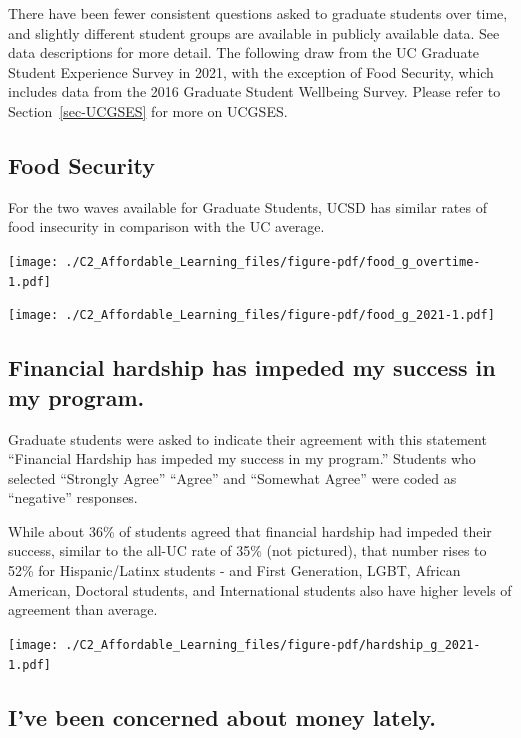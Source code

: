 \documentclass[
  letterpaper,
  DIV=11,
  numbers=noendperiod]{scrreprt}
\begin{document}
There have been fewer consistent questions asked to graduate students
over time, and slightly different student groups are available in
publicly available data. See data descriptions for more detail. The
following draw from the UC Graduate Student Experience Survey in 2021,
with the exception of Food Security, which includes data from the 2016
Graduate Student Wellbeing Survey. Please refer to
Section~\ref{sec-UCGSES} for more on UCGSES.

\hypertarget{food-security-1}{%
\subsection{Food Security}\label{food-security-1}}

For the two waves available for Graduate Students, UCSD has similar
rates of food insecurity in comparison with the UC average.

\texttt{[image: ./C2\_Affordable\_Learning\_files/figure-pdf/food\_g\_overtime-1.pdf]}

\texttt{[image: ./C2\_Affordable\_Learning\_files/figure-pdf/food\_g\_2021-1.pdf]}

\hypertarget{financial-hardship-has-impeded-my-success-in-my-program.}{%
\subsection{Financial hardship has impeded my success in my
program.}\label{financial-hardship-has-impeded-my-success-in-my-program.}}

Graduate students were asked to indicate their agreement with this
statement ``Financial Hardship has impeded my success in my program.''
Students who selected ``Strongly Agree'' ``Agree'' and ``Somewhat
Agree'' were coded as ``negative'' responses.

While about 36\% of students agreed that financial hardship had impeded
their success, similar to the all-UC rate of 35\% (not pictured), that
number rises to 52\% for Hispanic/Latinx students - and First
Generation, LGBT, African American, Doctoral students, and International
students also have higher levels of agreement than average.

\texttt{[image: ./C2\_Affordable\_Learning\_files/figure-pdf/hardship\_g\_2021-1.pdf]}

\hypertarget{ive-been-concerned-about-money-lately.}{%
\subsection{I've been concerned about money
lately.}\label{ive-been-concerned-about-money-lately.}}
\end{document}
